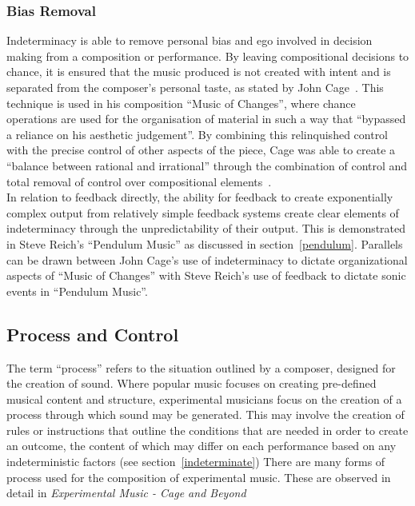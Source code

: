 \documentclass[titlepage]{scrartcl}
\begin{document}
    \subsubsection{Bias Removal}
    Indeterminacy is able to remove personal bias and ego involved in decision
    making from a composition or performance. By leaving compositional
    decisions to chance, it is ensured that the music produced is not created
    with intent and is separated from the composer's personal taste, as stated
    by John Cage~\parencite[p.381]{holmes2012eaem}. This technique is used in
    his composition ``Music of Changes'', where chance operations are used for
    the organisation of material in such a way that ``bypassed a reliance on his
    aesthetic judgement''. By combining this relinquished control with the
    precise control of other aspects of the piece, Cage was able to create a
    ``balance between rational and irrational'' through the combination of
    control and total removal of control over compositional
    elements~\parencite[p.97-98]{jc2009co}.\\
    In relation to feedback directly, the ability for feedback to create
    exponentially complex output from relatively simple feedback systems
    create clear elements of indeterminacy through the unpredictability of
    their output. This is demonstrated in Steve Reich's ``Pendulum Music'' as
    discussed in section~\ref{pendulum}. Parallels can be drawn between John
    Cage's use of indeterminacy to dictate organizational aspects of ``Music of
    Changes'' with Steve Reich's use of feedback to dictate sonic events in
    ``Pendulum Music''.
    
    \subsection{Process and Control}
    The term ``process'' refers to the situation outlined by a composer,
    designed for the creation of sound. Where popular music focuses on creating
    pre-defined musical content and structure, experimental musicians focus on
    the creation of a process through which sound may be generated. This may
    involve the creation of rules or instructions that outline the conditions
    that are needed in order to create an outcome, the content of which may
    differ on each performance based on any indeterministic factors (see
    section~\ref{indeterminate}) There are many forms of process used for the
    composition of experimental music. These are observed in detail in
    \textit{Experimental Music - Cage and
    Beyond}~\parencite[p.4-14]{nyman1999em}
\end{document}
